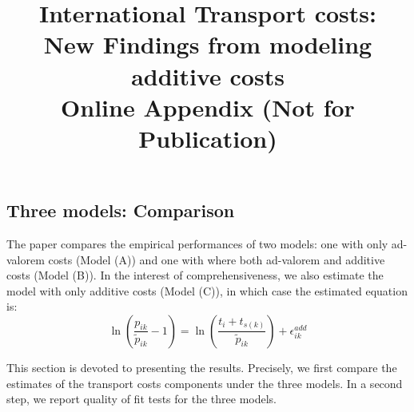 \documentclass[11pt,twoside, authoryear]{elsarticle}
\begin{document}
\title{\textbf{International Transport costs:\\New Findings from modeling additive costs}\\Online Appendix (Not for Publication)}





\maketitle






\tableofcontents
\vspace{1cm}
\newpage
\listoftables
\listoffigures

\newpage



%
%
%
%
%			
%			
%				
%
%

	\renewcommand\thesubsubsection{\Alph{subsection}.\arabic{subsubsection}}
	
	\renewcommand\thesubsection{\Alph{subsection}}
	
	
\subsection{Three models: Comparison \label{secoa:additive_only}}

The paper compares the empirical performances of two models: one with only ad-valorem costs (Model (A)) and one with where both ad-valorem and additive costs (Model (B)).
In the interest of comprehensiveness,  we also estimate the model with only additive costs (Model (C)), in which case the estimated equation is:
$$\ln\left(\frac{p_{ik}}{\widetilde{p}_{ik}}-1 \right)= \ln \left(\frac{t_{i} + t_{s(k)}}{\widetilde{p}_{ik}}\right) + \epsilon^{add}_{ik}$$

This section is devoted to presenting the results. Precisely, we first compare the estimates of the transport costs components under the three models. In a second step, we report quality of fit tests for the three models.
\end{document}
